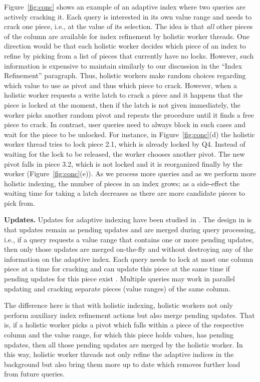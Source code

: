 Figure~\ref{fig:conc} shows an example of an adaptive index where two queries are actively cracking it.
Each query is interested in its own value range and needs to crack one piece, i.e., at the value of its selection.
The idea is that \emph{all} other pieces of the column are available for index refinement by holistic worker threads.
One direction would be that each holistic worker decides which piece of an index to refine
by picking from a list of pieces that currently have no locks.
However, such information is expensive to maintain similarly to our discussion in the ``Index Refinement'' paragraph.
Thus, holistic workers make random choices regarding which value to use as pivot and thus which piece to crack.
However, when a holistic worker requests a write latch to crack a piece and it happens that the piece is locked at the moment, then 
if the latch is not given immediately, the worker picks another random pivot and repeats the procedure
until it finds a free piece to crack. In contrast, user queries need to always block in such cases and wait for the piece to be unlocked.
For instance, in Figure~\ref{fig:conc}(d) the holistic worker thread tries to lock piece 2.1, which is already locked by Q4.
Instead of waiting for the lock to be released, the worker chooses another pivot.
The new pivot falls in piece 3.2, which is not locked and it is reorganized finally by the worker (Figure~\ref{fig:conc}(e)).
As we process more queries and as we perform more holistic indexing, 
the number of pieces in an index grows; as a side-effect 
the waiting time for taking a latch decreases as there are more candidate pieces to pick from.


\textbf{Updates.} 
Updates for adaptive indexing have been studied in \cite{DBLP:conf/sigmod/IdreosKM09}.
The design in \cite{DBLP:conf/sigmod/IdreosKM09} is that updates remain as pending updates
and are merged during query processing, i.e., if a query requests a value range that contains one or more pending updates,
then only those updates are merged on-the-fly and without destroying any of the information on the adaptive index.
Each query needs to lock at most one column piece at a time for cracking and can update this piece at the same time if pending updates for this piece exist \cite{DBLP:journals/pvldb/GraefeHIKM12, DBLP:journals/vldb/GraefeHIKMS14}. Multiple queries may work in parallel updating and cracking separate pieces (value ranges) of the same column.

The difference here is that with holistic indexing, holistic workers not only perform
auxiliary index refinement actions but also merge pending updates.
That is, if a holistic worker picks a pivot which falls within a piece of the respective column and the value range,
for which this piece holds values, has pending updates, then all those pending updates are merged by the holistic worker.
In this way, holistic worker threads not only refine the adaptive indices in the background but also bring them 
more up to date which removes further load from future queries.

